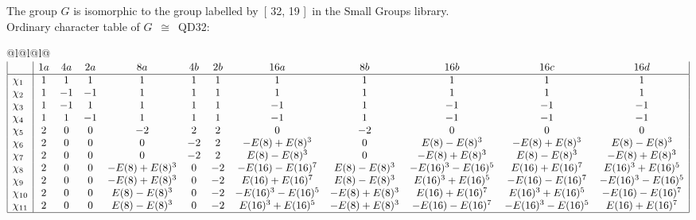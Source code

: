 \documentclass[varwidth=\maxdimen,border=10]{standalone}
\begin{document}
The group $G$ is isomorphic to the group labelled by\ [ 32, 19 ]\ in the Small Groups library.\\
Ordinary character table of $G$\ $\cong$\ QD32:\\
\begin{center}
\begin{tabular}{@{}l@{}l@{}l@{}}
\hline
\(\begin{array}{|l|ccccccccccc|}
  & 1a & 4a & 2a & 8a & 4b & 2b & 16a & 8b & 16b & 16c & 16d\\ \hline
\chi_{1} & 1 & 1 & 1 & 1 & 1 & 1 & 1 & 1 & 1 & 1 & 1\\
\chi_{2} & 1 & -1 & -1 & 1 & 1 & 1 & 1 & 1 & 1 & 1 & 1\\
\chi_{3} & 1 & -1 & 1 & 1 & 1 & 1 & -1 & 1 & -1 & -1 & -1\\
\chi_{4} & 1 & 1 & -1 & 1 & 1 & 1 & -1 & 1 & -1 & -1 & -1\\
\chi_{5} & 2 & 0 & 0 & -2 & 2 & 2 & 0 & -2 & 0 & 0 & 0\\
\chi_{6} & 2 & 0 & 0 & 0 & -2 & 2 & -E(8)+E(8)^{3} & 0 & E(8)-E(8)^{3} & -E(8)+E(8)^{3} & E(8)-E(8)^{3}\\
\chi_{7} & 2 & 0 & 0 & 0 & -2 & 2 & E(8)-E(8)^{3} & 0 & -E(8)+E(8)^{3} & E(8)-E(8)^{3} & -E(8)+E(8)^{3}\\
\chi_{8} & 2 & 0 & 0 & -E(8)+E(8)^{3} & 0 & -2 & -E(16)-E(16)^{7} & E(8)-E(8)^{3} & -E(16)^{3}-E(16)^{5} & E(16)+E(16)^{7} & E(16)^{3}+E(16)^{5}\\
\chi_{9} & 2 & 0 & 0 & -E(8)+E(8)^{3} & 0 & -2 & E(16)+E(16)^{7} & E(8)-E(8)^{3} & E(16)^{3}+E(16)^{5} & -E(16)-E(16)^{7} & -E(16)^{3}-E(16)^{5}\\
\chi_{10} & 2 & 0 & 0 & E(8)-E(8)^{3} & 0 & -2 & -E(16)^{3}-E(16)^{5} & -E(8)+E(8)^{3} & E(16)+E(16)^{7} & E(16)^{3}+E(16)^{5} & -E(16)-E(16)^{7}\\
\chi_{11} & 2 & 0 & 0 & E(8)-E(8)^{3} & 0 & -2 & E(16)^{3}+E(16)^{5} & -E(8)+E(8)^{3} & -E(16)-E(16)^{7} & -E(16)^{3}-E(16)^{5} & E(16)+E(16)^{7}\\
\hline
\end{array}\)\\
\end{tabular}
\end{center}
\end{document}
